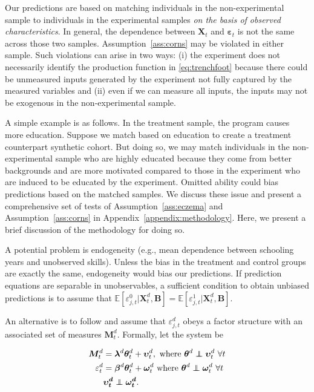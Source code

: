 Our predictions are based on matching individuals in the non-experimental sample to individuals in the experimental samples \textit{on the basis of observed characteristics}. In general, the dependence between $\bm{X}_{t}$ and $\bm{\varepsilon}_{t}$ is not the same across those two samples. Assumption~\eqref{ass:corns} may be violated in either sample. Such violations can arise in two ways: (i) the experiment does not necessarily identify the production function in \eqref{eq:trenchfoot} because there could be unmeasured inputs generated by the experiment not fully captured by the measured variables and (ii) even if we can measure all inputs, the inputs may not be exogenous in the non-experimental sample.

A simple example is as follows. In the treatment sample, the program causes more education. Suppose we match based on education to create a treatment counterpart synthetic cohort. But doing so, we may match individuals in the non-experimental sample who are highly educated because they come from better backgrounds and are more motivated compared to those in the experiment who are induced to be educated by the experiment. Omitted ability could bias predictions based on the matched samples. We discuss these issue and present a comprehensive set of tests of Assumption~\ref{ass:eczema} and Assumption~\ref{ass:corns} in Appendix~\ref{appendix:methodology}. Here, we present a brief discussion of the methodology for doing so.

A potential problem is endogeneity (e.g., mean dependence between schooling years and unobserved skills). Unless the bias in the treatment and control groups are exactly the same, endogeneity would bias our predictions. If prediction equations are separable in unobservables, a sufficient condition to obtain unbiased predictions is to assume that $\mathbb{E} \left[ \varepsilon_{j,t}^0 | \bm{X}_{t}^d, \bm{B} \right] = \mathbb{E} \left[ \varepsilon_{j,t}^1 | \bm{X}_{t}^d, \bm{B} \right]$.

An alternative is to follow \citet{Heckman_Pinto_etal_2013_PerryFactor} and assume that $\varepsilon_{j,t}^d$ obeys a factor structure with an associated set of measures $\bm{M}_{t}^d$. Formally, let the system be

\begin{eqnarray}\label{eq:msystemmain}
\bm{M}_{t}^d &= \bm{\lambda}^d \bm{\theta}_{t}^d +  \bm{\upsilon}_t^d, \text{ where } \bm{\theta}^d  \independent \bm{\upsilon}_{t}^d \ \forall t \\ \nonumber
\varepsilon_{t}^d &=\bm{\beta}^d \bm{\theta}_{t}^d + \bm{\omega}_{t}^d \text{ where } \bm{\theta}^d  \independent \bm{\omega}_{t}^d \ \forall t \\ \nonumber
&\bm{\upsilon_{t}^d} \independent \bm{\omega_{t}^d}.
\end{eqnarray}

